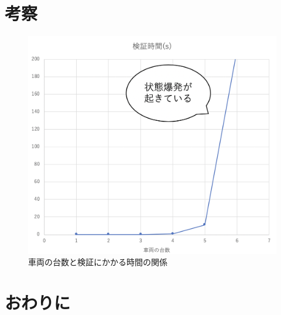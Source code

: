 \documentclass{tpu-sotu}
\begin{document}
\chapter{考察}
\begin{figure}[htbp]
	\centering
	\includegraphics[width=120mm]{IntersectionVerificationTime.png}
	\caption{車両の台数と検証にかかる時間の関係}
	\label{IVT}
	\end{figure}
\chapter{おわりに}
\acknowledgements

\begin{thebibliography}{1}
\end{thebibliography}
\end{document}
